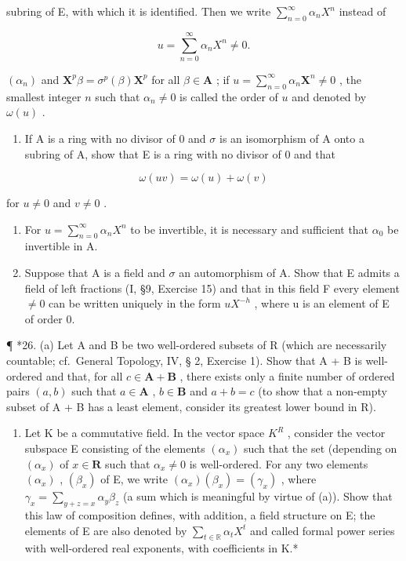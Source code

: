 subring of E, with which it is identified. Then we write \(\sum_{n=0}^{\infty} \alpha_n X^n\) instead of

\[
u = \sum_ {n = 0} ^ {\infty} \alpha_ {n} X ^ {n} \neq 0.
\]

\((\alpha_{n})\) and \(\mathbf{X}^{p}\beta = \sigma^{p}(\beta)\mathbf{X}^{p}\) for all \(\beta \in \mathbf{A}\) ; if \(u = \sum_{n=0}^{\infty} \alpha_{n}\mathbf{X}^{n} \neq 0\) , the smallest integer \(n\) such that \(\alpha_{n} \neq 0\) is called the order of \(u\) and denoted by \(\omega(u)\) .

\begin{enumerate}
\def\labelenumi{(\alph{enumi})}
\setcounter{enumi}{1}
\tightlist
\item
  If A is a ring with no divisor of 0 and \(\sigma\) is an isomorphism of A onto a subring of A, show that E is a ring with no divisor of 0 and that
\end{enumerate}

\[
\omega (u v) = \omega (u) + \omega (v)
\]

for \(u \neq 0\) and \(v \neq 0\) .

\begin{enumerate}
\def\labelenumi{(\alph{enumi})}
\setcounter{enumi}{2}
\item
  For \(u = \sum_{n=0}^{\infty} \alpha_n X^n\) to be invertible, it is necessary and sufficient that \(\alpha_0\) be invertible in A.
\item
  Suppose that A is a field and \(\sigma\) an automorphism of A. Show that E admits a field of left fractions (I, §9, Exercise 15) and that in this field F every element \(\neq0\) can be written uniquely in the form \(uX^{-h}\) , where u is an element of E of order 0.
\end{enumerate}

¶ *26. (a) Let A and B be two well-ordered subsets of R (which are necessarily countable; cf.~General Topology, IV, § 2, Exercise 1). Show that A + B is well-ordered and that, for all \(c \in \mathbf{A} + \mathbf{B}\) , there exists only a finite number of ordered pairs \((a, b)\) such that \(a \in \mathbf{A}\) , \(b \in \mathbf{B}\) and \(a + b = c\) (to show that a non-empty subset of A + B has a least element, consider its greatest lower bound in R).

\begin{enumerate}
\def\labelenumi{(\alph{enumi})}
\setcounter{enumi}{1}
\tightlist
\item
  Let K be a commutative field. In the vector space \(K^{R}\) , consider the vector subspace E consisting of the elements \((\alpha_{x})\) such that the set (depending on \((\alpha_{x})\) of \(x \in \mathbf{R}\) such that \(\alpha_{x} \neq 0\) is well-ordered. For any two elements \((\alpha_{x})\) , \((\beta_{x})\) of E, we write \((\alpha_{x})(\beta_{x}) = (\gamma_{x})\) , where \(\gamma_{x} = \sum_{y+z=x} \alpha_{y} \beta_{z}\) (a sum which is meaningful by virtue of (a)). Show that this law of composition defines, with addition, a field structure on E; the elements of E are also denoted by \(\sum_{t \in \mathbb{R}} \alpha_{t} X^{t}\) and called formal power series with well-ordered real exponents, with coefficients in K.*
\end{enumerate}

